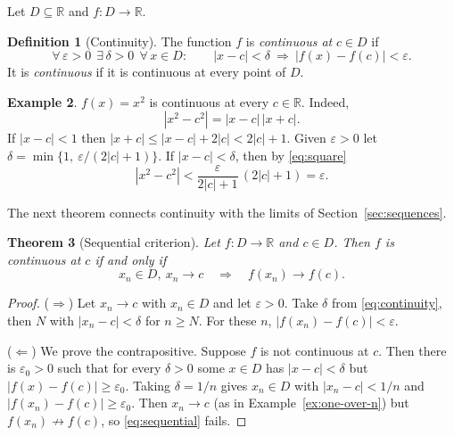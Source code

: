 \documentclass[11pt,a4paper]{book}
\newcommand{\R}{\mathbb{R}}
\newcommand{\abs}[1]{\left|#1\right|}
\numberwithin{equation}{section}          %
\theoremstyle{plain}
\newtheorem{theorem}{Theorem}[section]    %
\theoremstyle{definition}
\newtheorem{definition}[theorem]{Definition}
\newtheorem{example}[theorem]{Example}
\theoremstyle{remark}
\begin{document}
Let $D\subseteq\R$ and $f:D\to\R$.

\begin{definition}[Continuity]\label{def:continuity}
The function $f$ is \emph{continuous at} $c\in D$ if
\begin{equation}\label{eq:continuity}
    \forall\,\varepsilon>0\ \ \exists\,\delta>0\ \ \forall\,x\in D:\qquad
    \abs{x-c}<\delta\ \Longrightarrow\ \abs{f(x)-f(c)}<\varepsilon .
\end{equation}
It is \emph{continuous} if it is continuous at every point of $D$.
\end{definition}

\begin{example}\label{ex:square}
$f(x)=x^2$ is continuous at every $c\in\R$. Indeed,
\begin{equation}\label{eq:square}
    \abs{x^2-c^2}=\abs{x-c}\,\abs{x+c}.
\end{equation}
If $\abs{x-c}<1$ then $\abs{x+c}\le\abs{x-c}+2\abs c<2\abs c+1$. Given $\varepsilon>0$ let $\delta=\min\{1,\ \varepsilon/(2\abs c+1)\}$. If $\abs{x-c}<\delta$, then by \eqref{eq:square}
\[
    \abs{x^2-c^2}<\frac{\varepsilon}{2\abs c+1}\,(2\abs c+1)=\varepsilon .
\]
\end{example}

The next theorem connects continuity with the limits of Section~\ref{sec:sequences}.

\begin{theorem}[Sequential criterion]\label{thm:sequential}
Let $f:D\to\R$ and $c\in D$. Then $f$ is continuous at $c$ if and only if
\begin{equation}\label{eq:sequential}
    x_n\in D,\ x_n\to c\quad\Longrightarrow\quad f(x_n)\to f(c).
\end{equation}
\end{theorem}

\begin{proof}
($\Rightarrow$) Let $x_n\to c$ with $x_n\in D$ and let $\varepsilon>0$. Take $\delta$ from \eqref{eq:continuity}, then $N$ with $\abs{x_n-c}<\delta$ for $n\ge N$. For these $n$, $\abs{f(x_n)-f(c)}<\varepsilon$.

($\Leftarrow$) We prove the contrapositive. Suppose $f$ is not continuous at $c$. Then there is $\varepsilon_0>0$ such that for every $\delta>0$ some $x\in D$ has $\abs{x-c}<\delta$ but $\abs{f(x)-f(c)}\ge\varepsilon_0$. Taking $\delta=1/n$ gives $x_n\in D$ with $\abs{x_n-c}<1/n$ and $\abs{f(x_n)-f(c)}\ge\varepsilon_0$. Then $x_n\to c$ (as in Example~\ref{ex:one-over-n}) but $f(x_n)\not\to f(c)$, so \eqref{eq:sequential} fails.
\end{proof}
\end{document}
